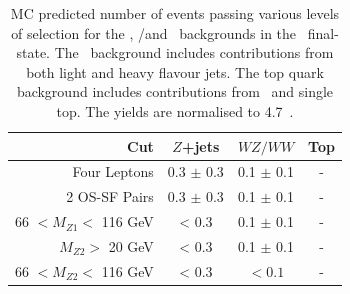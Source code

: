 \begin{table}[htbp]
  \centering
  \begin{tabular}{r|c|c|c} 
    \hline\hline
                 Cut &               $Z$+jets &             $WZ/WW$ &               Top\\ 
    \hline

        Four Leptons        &  0.3 $\pm$ 0.3 & 0.1 $\pm$ 0.1    & - \\ 
       2 OS-SF Pairs        &  0.3 $\pm$ 0.3 & 0.1 $\pm$ 0.1    & - \\ 
66 $ < M_{Z1} < $ 116 GeV   &  < 0.3         & 0.1 $\pm$ 0.1    & - \\ 
  $M_{Z2} > $ 20 GeV        &  < 0.3         & 0.1 $\pm$ 0.1    & - \\ 
66 $ < M_{Z2} < $ 116 GeV   &  < 0.3         & $<0.1$           & - \\ 
    \hline\hline
  \end{tabular}
  \caption[MC predicted number of events passing various levels of selection for
  the \Zjets, \WZ/\WW and \topquark\ backgrounds in the  \mmmm\ final-state.]
  {MC predicted number of events passing various levels of selection for
  the \Zjets, \WZ/\WW and \topquark\ backgrounds in the \mmmm\ final-state. The
  \Zjets\ background includes contributions from both light and heavy flavour
  jets. The top quark background includes contributions from \ttbar\ and
  single top. The yields are normalised to 4.7~\ifb.
  }
  \label{table:mc-bg-4mu}
\end{table}

